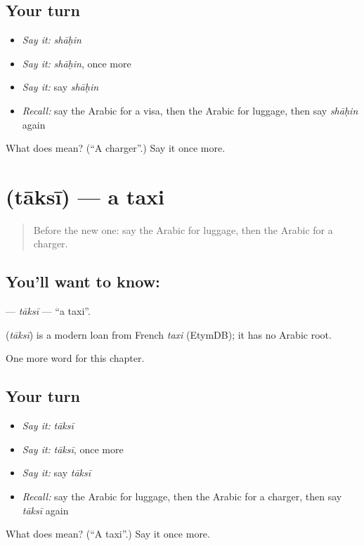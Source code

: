 \subsection*{Your turn}
\begin{itemize}
\raggedright
  \item \emph{Say it:} \emph{shāḥin}
  \item \emph{Say it:} \emph{shāḥin}, once more
  \item \emph{Say it:} say \emph{shāḥin}
  \item \emph{Recall:} say the Arabic for a visa, then the Arabic for luggage, then say \emph{shāḥin} again
\end{itemize}

\begin{tcolorbox}[breakable,colback=teal!4,colframe=teal!35!black,title={Before you move on}]
What does  mean? (\textquotedblleft{}A charger\textquotedblright{}.) Say it once more.
\end{tcolorbox}
\section[\texorpdfstring{\ar{تاكسي} (tāksī)}{تاكسي (tāksī)}]{ (tāksī) — a taxi}

\label{lesson:AR-C215-taksi}



\begin{quote}
Before the new one: say the Arabic for luggage, then the Arabic for a charger.
\end{quote}

\subsection*{You'll want to know: }
\textbf{} — \emph{tāksī} — \textquotedblleft{}a taxi\textquotedblright{}.

\begin{cousinweb}
\textbf{} (\emph{tāksī}) is a modern loan from French \emph{taxi} (EtymDB); it has no Arabic root.
\end{cousinweb}

\begin{grammarlens}[title={What you've built}]
One more word for this chapter.
\end{grammarlens}

\subsection*{Your turn}
\begin{itemize}
\raggedright
  \item \emph{Say it:} \emph{tāksī}
  \item \emph{Say it:} \emph{tāksī}, once more
  \item \emph{Say it:} say \emph{tāksī}
  \item \emph{Recall:} say the Arabic for luggage, then the Arabic for a charger, then say \emph{tāksī} again
\end{itemize}

\begin{tcolorbox}[breakable,colback=teal!4,colframe=teal!35!black,title={Before you move on}]
What does  mean? (\textquotedblleft{}A taxi\textquotedblright{}.) Say it once more.
\end{tcolorbox}
